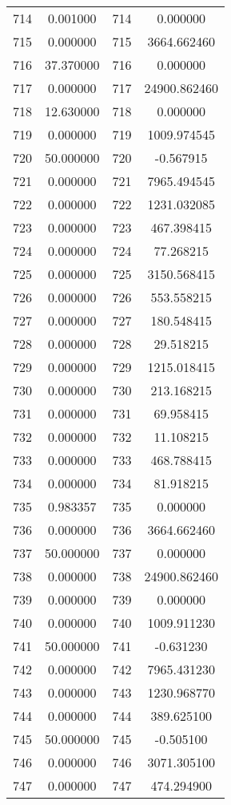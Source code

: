 \documentclass[12pt]{article}
\begin{document}
\begin{longtable}{@{}cccc@{}}
714 & 0.001000 & 714 & 0.000000 \\
715 & 0.000000 & 715 & 3664.662460 \\
716 & 37.370000 & 716 & 0.000000 \\
717 & 0.000000 & 717 & 24900.862460 \\
718 & 12.630000 & 718 & 0.000000 \\
719 & 0.000000 & 719 & 1009.974545 \\
720 & 50.000000 & 720 & -0.567915 \\
721 & 0.000000 & 721 & 7965.494545 \\
722 & 0.000000 & 722 & 1231.032085 \\
723 & 0.000000 & 723 & 467.398415 \\
724 & 0.000000 & 724 & 77.268215 \\
725 & 0.000000 & 725 & 3150.568415 \\
726 & 0.000000 & 726 & 553.558215 \\
727 & 0.000000 & 727 & 180.548415 \\
728 & 0.000000 & 728 & 29.518215 \\
729 & 0.000000 & 729 & 1215.018415 \\
730 & 0.000000 & 730 & 213.168215 \\
731 & 0.000000 & 731 & 69.958415 \\
732 & 0.000000 & 732 & 11.108215 \\
733 & 0.000000 & 733 & 468.788415 \\
734 & 0.000000 & 734 & 81.918215 \\
735 & 0.983357 & 735 & 0.000000 \\
736 & 0.000000 & 736 & 3664.662460 \\
737 & 50.000000 & 737 & 0.000000 \\
738 & 0.000000 & 738 & 24900.862460 \\
739 & 0.000000 & 739 & 0.000000 \\
740 & 0.000000 & 740 & 1009.911230 \\
741 & 50.000000 & 741 & -0.631230 \\
742 & 0.000000 & 742 & 7965.431230 \\
743 & 0.000000 & 743 & 1230.968770 \\
744 & 0.000000 & 744 & 389.625100 \\
745 & 50.000000 & 745 & -0.505100 \\
746 & 0.000000 & 746 & 3071.305100 \\
747 & 0.000000 & 747 & 474.294900 \\

\end{longtable}
\end{document}
